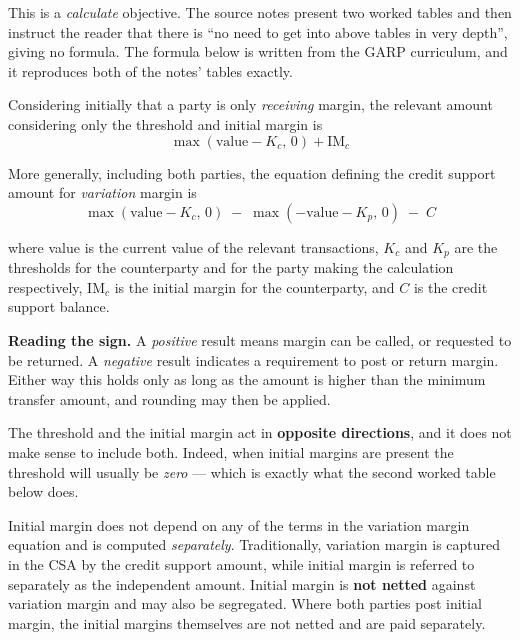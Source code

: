 \gapbadge

{\footnotesize\color{FRMGrey}This is a \emph{calculate} objective. The source notes
present two worked tables and then instruct the reader that there is ``no need to
get into above tables in very depth'', giving no formula. The formula below is
written from the GARP curriculum, and it reproduces both of the notes' tables
exactly.}

\begin{crgapbox}
Considering initially that a party is only \emph{receiving} margin, the relevant
amount considering only the threshold and initial margin is
\[ \max(\text{value} - K_c,\, 0) + \mathrm{IM}_c \]

More generally, including both parties, the equation defining the credit support
amount for \emph{variation} margin is
\[ \max(\text{value} - K_c,\, 0) \;-\; \max(-\text{value} - K_p,\, 0) \;-\; C \]

where value is the current value of the relevant transactions, $K_c$ and $K_p$ are
the thresholds for the counterparty and for the party making the calculation
respectively, $\mathrm{IM}_c$ is the initial margin for the counterparty, and $C$
is the credit support balance.

\smallskip
\textbf{Reading the sign.} A \emph{positive} result means margin can be called, or
requested to be returned. A \emph{negative} result indicates a requirement to post
or return margin. Either way this holds only as long as the amount is higher than
the minimum transfer amount, and rounding may then be applied.
\end{crgapbox}

\begin{crtrapbox}
The threshold and the initial margin act in \textbf{opposite directions}, and it
does not make sense to include both. Indeed, when initial margins are present the
threshold will usually be \emph{zero} --- which is exactly what the second worked
table below does.

\smallskip
Initial margin does not depend on any of the terms in the variation margin
equation and is computed \emph{separately}. Traditionally, variation margin is
captured in the CSA by the credit support amount, while initial margin is referred
to separately as the independent amount. Initial margin is \textbf{not netted}
against variation margin and may also be segregated. Where both parties post
initial margin, the initial margins themselves are not netted and are paid
separately.
\end{crtrapbox}

